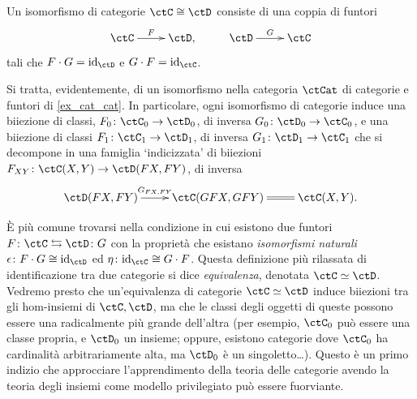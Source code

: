 \begin{definition}\label{fun_isocat}
 Un isomorfismo di categorie \(\ctC\cong\ctD\) consiste di una coppia di funtori
 \[\xymatrix{
   \ctC \ar[r]^-F & \ctD, & \ctD \ar[r]^-G & \ctC
  }\]
 tali che \(F\cmp G = \Id[\ctD]\) e \(G\cmp F = \Id[\ctC]\).

 Si tratta, evidentemente, di un isomorfismo nella categoria \(\ctCat\) di categorie e funtori di \ref{ex_cat_cat}. In particolare, ogni isomorfismo di categorie induce una biiezione di classi, \(F_0 \colon \ctC_0\to\ctD_0\), di inversa \(G_0 \colon \ctD_0\to\ctC_0\), e una biiezione di classi \(F_1 \colon \ctC_1 \to \ctD_1\), di inversa \(G_1 \colon \ctD_1\to\ctC_1\) che si decompone in una famiglia `indicizzata' di biiezioni \(F_{XY} \colon \Hom{\ctC}(X,Y)\to\Hom{\ctD}(FX,FY)\), di inversa
 \[\xymatrix{
  \Hom{\ctD}(FX,FY) \ar[r]^-{G_{FX,FY}} & \Hom{\ctC}(GFX,GFY) \ar@{=}[r] & \Hom{\ctC}(X,Y).
  }\]
\end{definition}
È più comune trovarsi nella condizione in cui esistono due funtori \(F \colon \ctC \leftrightarrows \ctD\colon G\) con la proprietà che esistano \emph{isomorfismi naturali} \(\epsilon \colon F\cmp G \cong \Id[\ctD]\) ed \(\eta \colon \Id[\ctC]\cong G\cmp F\). Questa definizione più rilassata di identificazione tra due categorie si dice \emph{equivalenza}, denotata \(\ctC\simeq\ctD\). Vedremo presto che un'equivalenza di categorie \(\ctC\simeq\ctD\) induce biiezioni tra gli hom-insiemi di \(\ctC,\ctD\), ma che le classi degli oggetti di queste possono essere una radicalmente più grande dell'altra (per esempio, \(\ctC_0\) può essere una classe propria, e \(\ctD_0\) un insieme; oppure, esistono categorie dove \(\ctC_0\) ha cardinalità arbitrariamente alta, ma \(\ctD_0\) è un singoletto\dots). Questo è un primo indizio che approcciare l'apprendimento della teoria delle categorie avendo la teoria degli insiemi come modello privilegiato può essere fuorviante.
